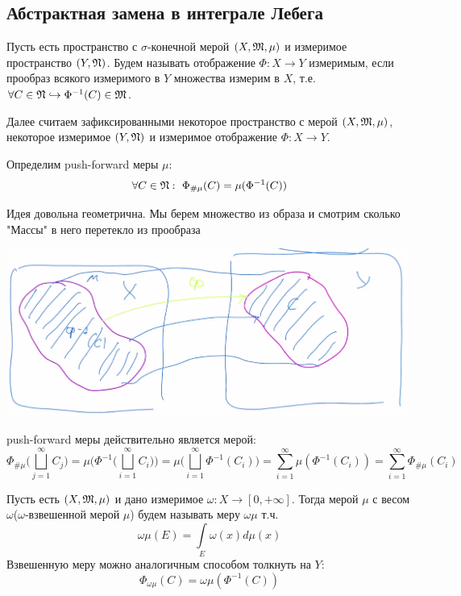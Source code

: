 \subsection{Абстрактная замена в интеграле Лебега}
\begin{definition}
    Пусть есть пространство с $\sigma$-конечной мерой $(X, \mathfrak{M}, \mu)$ и измеримое пространство $(Y, \mathfrak{N})$. Будем называть отображение $\Phi: X \rightarrow Y$ измеримым, если прообраз всякого измеримого в $Y$ множества измерим в $X$, т.е. $\forall C \in \mathfrak{N} \hookrightarrow \Phi^{-1}(C) \in \mathfrak{M}$.
\end{definition}
Далее считаем зафиксированными некоторое пространство с мерой $(X, \mathfrak{M}, \mu)$, некоторое измеримое $(Y, \mathfrak{N})$ и измеримое отображение $\Phi: X \rightarrow Y$.
\begin{definition}
    Определим push-forward меры $\mu$: \[\forall C \in \mathfrak{N}:  \ \Phi_{\# \mu}(C) = \mu(\Phi^{-1}(C)) \]



\begin{minipage}{0.3\textwidth}\raggedleft
Идея довольна геометрична. Мы берем множество из образа и смотрим сколько "Массы" в него перетекло из прообраза
\end{minipage}    
\begin{minipage}{0.7\textwidth}%
    \includegraphics[width=0.99\textwidth]{images/Screenshot_14.png} 
\end{minipage}%
\hfill%


    
    push-forward меры действительно является мерой: \[ \Phi_{\#\mu}\biggl(\bigsqcup\limits_{j = 1}^\infty C_j\biggr) = \mu\biggl(\Phi^{-1}\biggl(\bigsqcup\limits_{i = 1}^\infty C_i\biggr)\biggr) = \mu\biggl(\bigsqcup\limits_{i = 1}^\infty \Phi^{-1}(C_i)\biggr) = \sum\limits_{i = 1}^\infty \mu(\Phi^{-1}(C_i)) = \sum\limits_{i = 1}^\infty \Phi_{\#\mu}(C_i)\]
\end{definition}
\begin{definition}
    Пусть есть $(X, \mathfrak{M}, \mu)$ и дано измеримое $\omega: X \rightarrow [0, +\infty]$. Тогда мерой $\mu$ с весом $\omega$($\omega$-взвешенной мерой $\mu$) будем называть меру $\omega\mu$ т.ч. \[\omega\mu(E) = \int\limits_E \omega(x) d\mu(x
    )\]
    Взвешенную меру можно аналогичным способом толкнуть на $Y:$ \[\Phi_{\omega\mu}(C) = \omega\mu(\Phi^{-1}(C))\]
\end{definition}

